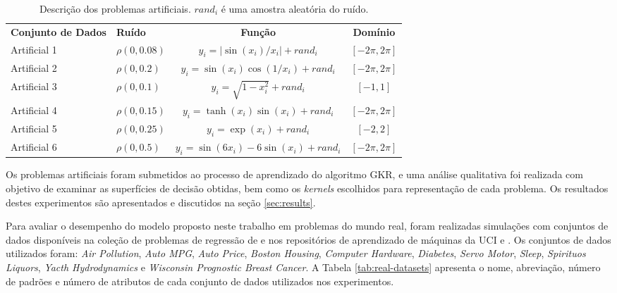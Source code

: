 \begin{table}[H]
    \caption{Descrição dos problemas artificiais. $rand_i$ é uma amostra aleatória do ruído.}
    \label{tab:art-datasets}
    \begin{center}
            \begin{tabular}{ll@{\hskip 10pt}c@{\hskip 10pt}c} \hline\noalign{\smallskip}
            \textbf{Conjunto de Dados} & \textbf{Ruído} & \textbf{Função} & \textbf{Domínio} \\
            \noalign{\smallskip}
            \hline
            \noalign{\smallskip}
            Artificial 1 & $\rho(0, 0.08)$ & $y_i = |\sin(x_i)/x_i| + rand_i$ & $[-2\pi, 2\pi]$ \\
            Artificial 2 & $\rho(0, 0.2)$ & $y_i = \sin(x_i) \cos(1/x_i) + rand_i$ & $[-2\pi, 2\pi]$ \\
            Artificial 3 & $\rho(0, 0.1)$ & $y_i = \sqrt{1 - x_i^2} + rand_i$ & $[-1, 1]$ \\
            Artificial 4 & $\rho(0, 0.15)$ & $y_i = \tanh{(x_i)}\sin{(x_i)} + rand_i$ & $[-2\pi, 2\pi]$ \\
            Artificial 5 & $\rho(0, 0.25)$ & $y_i = \exp(x_i) + rand_i$ & $[-2, 2]$ \\
            Artificial 6 & $\rho(0, 0.5)$ & $y_i = \sin(6x_i) - 6\sin(x_i) + rand_i$ & $[-2\pi, 2\pi]$ \\
            \hline
        \end{tabular}
    \end{center}
    \begin{center}
    \end{center}
\end{table}

Os problemas artificiais foram submetidos ao processo de aprendizado do algoritmo GKR, e uma análise qualitativa foi realizada com objetivo de examinar as superfícies de decisão obtidas, bem como os \textit{kernels} escolhidos para representação de cada problema. Os resultados destes experimentos são apresentados e discutidos na seção \ref{sec:results}.

Para avaliar o desempenho do modelo proposto neste trabalho em problemas do mundo real, foram realizadas simulações com conjuntos de dados disponíveis na coleção de problemas de regressão de  e nos repositórios de aprendizado de máquinas da UCI \cite{dua2017} e . Os conjuntos de dados utilizados foram: \textit{Air Pollution}, \textit{Auto MPG}, \textit{Auto Price}, \textit{Boston Housing}, \textit{Computer Hardware}, \textit{Diabetes}, \textit{Servo Motor}, \textit{Sleep}, \textit{Spirituos Liquors}, \textit{Yacth Hydrodynamics} e \textit{Wisconsin Prognostic Breast Cancer}. A Tabela \ref{tab:real-datasets} apresenta o nome, abreviação, número de padrões e número de atributos de cada conjunto de dados utilizados nos experimentos.

